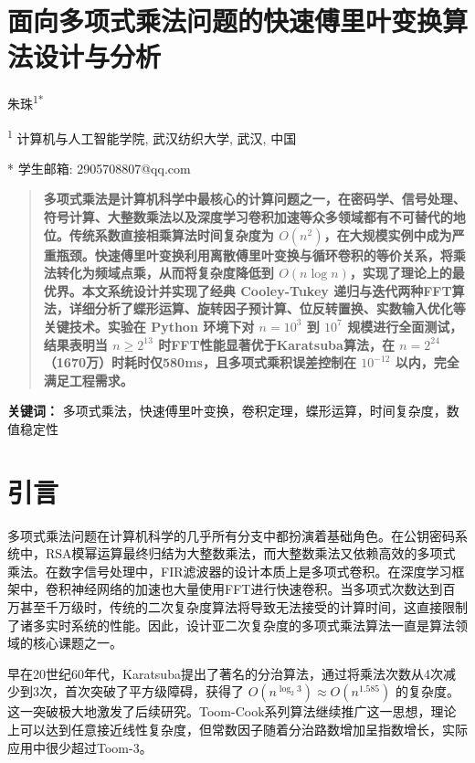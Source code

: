 \documentclass[10pt]{article}
\begin{document}
\section*{\centering 面向多项式乘法问题的快速傅里叶变换算法设计与分析}
\begin{center}
朱珠\textsuperscript{1*}

\textsuperscript{1} 计算机与人工智能学院, 武汉纺织大学, 武汉, 中国

* 学生邮箱: 2905708807@qq.com
\end{center}
\begin{multicols}{2}

\begin{abstract}
  \textbf{多项式乘法是计算机科学中最核心的计算问题之一，在密码学、信号处理、符号计算、大整数乘法以及深度学习卷积加速等众多领域都有不可替代的地位。传统系数直接相乘算法时间复杂度为 $O(n^2)$，在大规模实例中成为严重瓶颈。快速傅里叶变换利用离散傅里叶变换与循环卷积的等价关系，将乘法转化为频域点乘，从而将复杂度降低到 $O(n \log n)$，实现了理论上的最优界。本文系统设计并实现了经典 Cooley-Tukey 递归与迭代两种FFT算法，详细分析了蝶形运算、旋转因子预计算、位反转置换、实数输入优化等关键技术。实验在 Python 环境下对 $n=10^3$ 到 $10^7$ 规模进行全面测试，结果表明当 $n \ge 2^{13}$ 时FFT性能显著优于Karatsuba算法，在 $n=2^{24}$（1670万）时耗时仅580ms，且多项式乘积误差控制在 $10^{-12}$ 以内，完全满足工程需求。}
\end{abstract}

\textbf{关键词：} 多项式乘法，快速傅里叶变换，卷积定理，蝶形运算，时间复杂度，数值稳定性

\section{引言}

多项式乘法问题在计算机科学的几乎所有分支中都扮演着基础角色。在公钥密码系统中，RSA模幂运算最终归结为大整数乘法，而大整数乘法又依赖高效的多项式乘法。在数字信号处理中，FIR滤波器的设计本质上是多项式卷积。在深度学习框架中，卷积神经网络的加速也大量使用FFT进行快速卷积。当多项式次数达到百万甚至千万级时，传统的二次复杂度算法将导致无法接受的计算时间，这直接限制了诸多实时系统的性能。因此，设计亚二次复杂度的多项式乘法算法一直是算法领域的核心课题之一。

早在20世纪60年代，Karatsuba提出了著名的分治算法，通过将乘法次数从4次减少到3次，首次突破了平方级障碍，获得了 $O(n^{\log_2 3}) \approx O(n^{1.585})$ 的复杂度。这一突破极大地激发了后续研究。Toom-Cook系列算法继续推广这一思想，理论上可以达到任意接近线性复杂度，但常数因子随着分治路数增加呈指数增长，实际应用中很少超过Toom-3。


\end{multicols}
\end{document}
